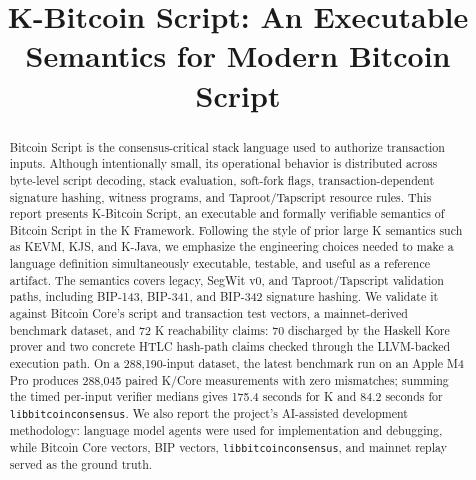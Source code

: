 \documentclass[conference]{IEEEtran}
\newcommand{\kframework}{K Framework\xspace}
\newcommand{\bitcoin}{Bitcoin\xspace}
\begin{document}
\title{K-Bitcoin Script: An Executable Semantics for Modern Bitcoin Script}

\author{
  \and
}

\maketitle
\thispagestyle{plain}
\pagestyle{plain}

\begin{abstract}
\bitcoin Script is the consensus-critical stack language used to authorize
transaction inputs.  Although intentionally small, its operational behavior is
distributed across byte-level script decoding, stack evaluation, soft-fork
flags, transaction-dependent signature hashing, witness programs, and
Taproot/Tapscript resource rules.  This report presents K-Bitcoin Script, an
executable and formally verifiable semantics of \bitcoin Script in the
\kframework.  Following the style of prior large K semantics such as KEVM,
KJS, and K-Java, we emphasize the engineering choices needed to make a language
definition simultaneously executable, testable, and useful as a reference
artifact.  The semantics covers legacy, SegWit v0, and Taproot/Tapscript
validation paths, including BIP-143, BIP-341, and BIP-342 signature hashing.
We validate it against Bitcoin Core's script and transaction test vectors, a
mainnet-derived benchmark dataset, and 72 K reachability claims: 70 discharged
by the Haskell Kore prover and two concrete HTLC hash-path claims checked
through the LLVM-backed execution path.  On a 288,190-input dataset, the latest
benchmark run on an Apple M4 Pro produces 288,045 paired K/Core measurements
with zero mismatches; summing the timed per-input verifier medians gives
175.4 seconds for K and 84.2 seconds for \texttt{libbitcoinconsensus}.  We also
report the
project's AI-assisted development methodology: language model agents were used
for implementation and debugging, while Bitcoin Core vectors, BIP vectors,
\texttt{libbitcoinconsensus}, and mainnet replay served as the ground truth.
\end{abstract}
\end{document}
